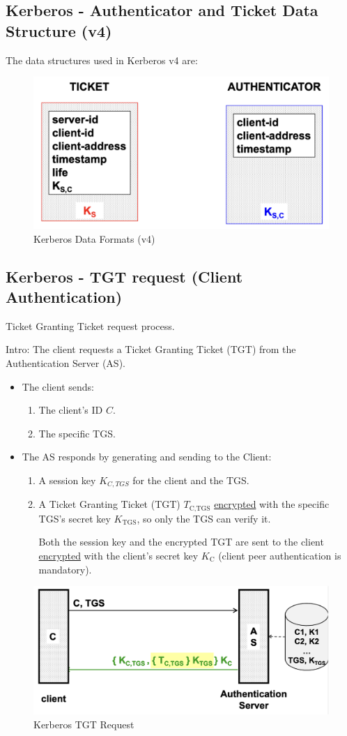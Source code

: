 \subsection*{Kerberos - Authenticator and Ticket Data Structure (v4)}
The data structures used in Kerberos v4 are:
\begin{figure}[H]
    \centering
    \includegraphics[width=0.5\linewidth]{Images/Authentication/kerDataFormats.png}
    \caption{Kerberos Data Formats (v4)}
\end{figure}

\subsection*{Kerberos - TGT request (Client Authentication)}
\begin{center}
    Ticket Granting Ticket request process.
\end{center}
Intro:
The client requests a Ticket Granting Ticket (TGT) from the Authentication Server (AS).
\begin{itemize}
    \item The client sends:
    \begin{enumerate}
        \item The client's ID $C$.
        \item The specific TGS.
    \end{enumerate} 
    \item The AS responds by generating and sending to the Client:
    \begin{enumerate}
        \item A session key $K_{C,TGS}$ for the client and the TGS.
        \item A Ticket Granting Ticket (TGT)  $T_{\text{C,TGS}}$ \underline{encrypted} with the specific TGS's secret key $K_{\text{TGS}}$, so only the TGS can verify it.
        
        \begin{center}
            Both the session key and the encrypted TGT are sent to the client \underline{encrypted} with the client's secret key $K_{\text{C}}$ (client peer authentication is mandatory).
        \end{center}
    \end{enumerate}
\end{itemize}
\begin{figure}[H]
    \centering
    \includegraphics[width=0.5\linewidth]{Images/Authentication/kerreq.png}
    \caption{Kerberos TGT Request}
\end{figure}

